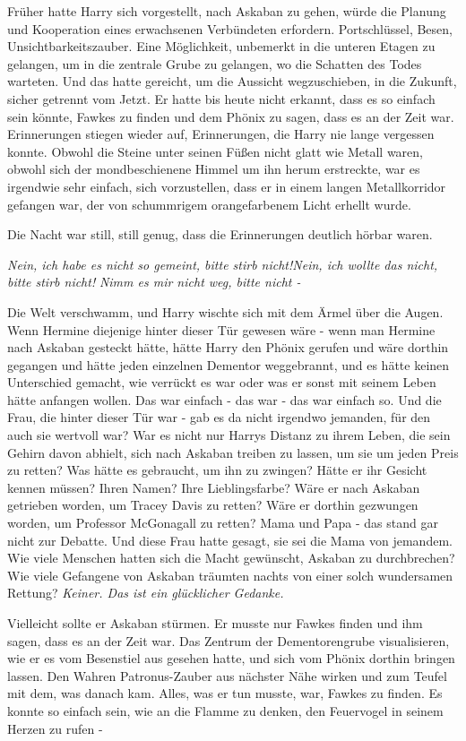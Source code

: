 Früher hatte Harry sich vorgestellt, nach Askaban zu gehen, würde die Planung
und Kooperation eines erwachsenen Verbündeten erfordern. Portschlüssel, Besen,
Unsichtbarkeitszauber. Eine Möglichkeit, unbemerkt in die unteren Etagen zu
gelangen, um in die zentrale Grube zu gelangen, wo die Schatten des Todes
warteten. Und das hatte gereicht, um die Aussicht wegzuschieben, in die Zukunft,
sicher getrennt vom Jetzt. Er hatte bis heute nicht erkannt, dass es so einfach
sein könnte, Fawkes zu finden und dem Phönix zu sagen, dass es an der Zeit war.
Erinnerungen stiegen wieder auf, Erinnerungen, die Harry nie lange vergessen
konnte. Obwohl die Steine unter seinen Füßen nicht glatt wie Metall waren,
obwohl sich der mondbeschienene Himmel um ihn herum erstreckte, war es irgendwie
sehr einfach, sich vorzustellen, dass er in einem langen Metallkorridor gefangen
war, der von schummrigem orangefarbenem Licht erhellt wurde.

Die Nacht war still, still genug, dass die Erinnerungen deutlich hörbar waren.

\emph{Nein, ich habe es nicht so gemeint, bitte stirb nicht!}\emph{Nein, ich
wollte das nicht, bitte stirb nicht!} \emph{Nimm es mir nicht weg, bitte nicht
-}

Die Welt verschwamm, und Harry wischte sich mit dem Ärmel über die Augen. Wenn
Hermine diejenige hinter dieser Tür gewesen wäre - wenn man Hermine nach Askaban
gesteckt hätte, hätte Harry den Phönix gerufen und wäre dorthin gegangen und
hätte jeden einzelnen Dementor weggebrannt, und es hätte keinen Unterschied
gemacht, wie verrückt es war oder was er sonst mit seinem Leben hätte anfangen
wollen. Das war einfach - das war - das war einfach so. Und die Frau, die hinter
dieser Tür war - gab es da nicht irgendwo jemanden, für den auch sie wertvoll
war? War es nicht nur Harrys Distanz zu ihrem Leben, die sein Gehirn davon
abhielt, sich nach Askaban treiben zu lassen, um sie um jeden Preis zu retten?
Was hätte es gebraucht, um ihn zu zwingen? Hätte er ihr Gesicht kennen müssen?
Ihren Namen? Ihre Lieblingsfarbe? Wäre er nach Askaban getrieben worden, um
Tracey Davis zu retten? Wäre er dorthin gezwungen worden, um Professor
McGonagall zu retten? Mama und Papa - das stand gar nicht zur Debatte. Und diese
Frau hatte gesagt, sie sei die Mama von jemandem. Wie viele Menschen hatten
sich die Macht gewünscht, Askaban zu durchbrechen? Wie viele Gefangene von
Askaban träumten nachts von einer solch wundersamen Rettung?\emph{ Keiner. Das
ist ein glücklicher Gedanke.}

Vielleicht sollte er Askaban stürmen. Er musste nur Fawkes finden und ihm sagen,
dass es an der Zeit war. Das Zentrum der Dementorengrube visualisieren, wie er
es vom Besenstiel aus gesehen hatte, und sich vom Phönix dorthin bringen lassen.
Den Wahren Patronus-Zauber aus nächster Nähe wirken und zum Teufel mit dem, was
danach kam. Alles, was er tun musste, war, Fawkes zu finden. Es konnte so
einfach sein, wie an die Flamme zu denken, den Feuervogel in seinem Herzen zu
rufen -

